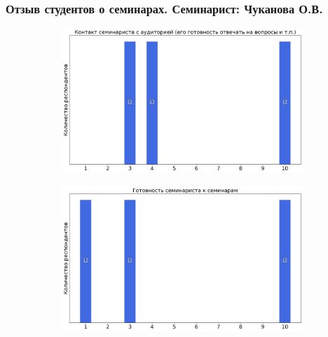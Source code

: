     \subsubsection{Отзыв студентов о семинарах. Семинарист: Чуканова О.В.}
        \begin{figure}[H]
            \centering
            \begin{subfigure}[b]{0.45\textwidth}
                \centering
                \includegraphics[width=\textwidth]{images/2 course/Компьютерные технологии/seminarists-marks-Чуканова О.В.-0.png}
            \end{subfigure}
            \begin{subfigure}[b]{0.45\textwidth}
                \centering
                \includegraphics[width=\textwidth]{images/2 course/Компьютерные технологии/seminarists-marks-Чуканова О.В.-1.png}
            \end{subfigure}
            \begin{subfigure}[b]{0.45\textwidth}
                \centering

\end{subfigure}
\end{figure}
